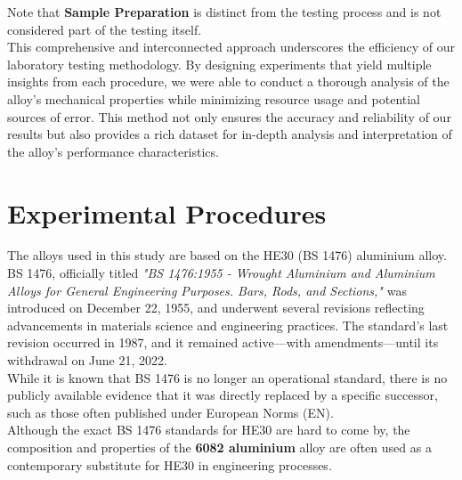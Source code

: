 \documentclass{article}
\begin{document}
Note that \textbf{Sample Preparation} is distinct from the testing process and is not considered part of the testing itself.\\[1em]
This comprehensive and interconnected approach underscores the efficiency of our laboratory testing methodology. By designing experiments that yield multiple insights from each procedure, we were able to conduct a thorough analysis of the alloy's mechanical properties while minimizing resource usage and potential sources of error. This method not only ensures the accuracy and reliability of our results but also provides a rich dataset for in-depth analysis and interpretation of the alloy's performance characteristics.
\newpage

\section{Experimental Procedures}
The alloys used in this study are based on the HE30 (BS 1476) aluminium alloy. BS 1476, officially titled \textit{"BS 1476:1955 - Wrought Aluminium and Aluminium Alloys for General Engineering Purposes. Bars, Rods, and Sections,"} was introduced on December 22, 1955, and underwent several revisions reflecting advancements in materials science and engineering practices. The standard’s last revision occurred in 1987, and it remained active—with amendments—until its withdrawal on June 21, 2022.\\[1em]
While it is known that BS 1476 is no longer an operational standard, there is no publicly available evidence that it was directly replaced by a specific successor, such as those often published under European Norms (EN).\\[1em] 
Although the exact BS 1476 standards for HE30 are hard to come by, the composition and properties of the \textbf{6082 aluminium} alloy are often used as a contemporary substitute for HE30 in engineering processes.
\end{document}
